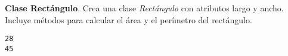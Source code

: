 \begin{exercise}{\rm \textbf{Clase Rectángulo}. 
Crea una clase \emph{Rectángulo} con atributos largo y ancho. Incluye
métodos para calcular el área y el perímetro del rectángulo.

\begin{Shaded}
\begin{Highlighting}[]
     \NormalTok{(}
        \OperatorTok{=}
        \OperatorTok{=}

    \NormalTok{):}
          \OperatorTok{*}\NormalTok{ (}\OperatorTok{+} 

    \NormalTok{):}
         \OperatorTok{*} 


\OperatorTok{=}\NormalTok{, }\NormalTok{)}
\end{Highlighting}
\end{Shaded}

\begin{verbatim}
28
45

\end{verbatim}
}\end{exercise}

